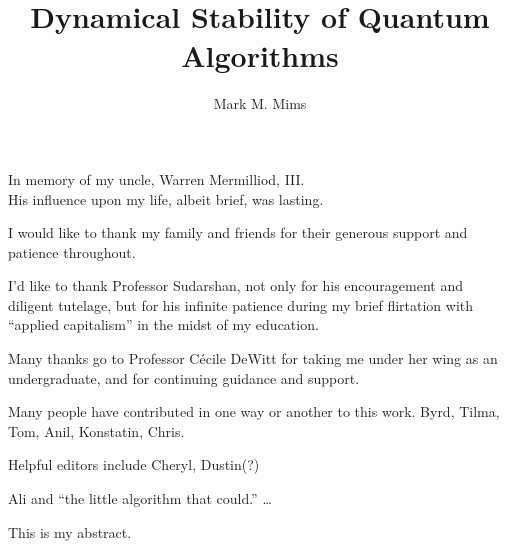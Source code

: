 \documentclass[12pt]{report} %
\author{Mark M. Mims}  %
\title{Dynamical Stability of Quantum Algorithms}
\theoremstyle{definition}
\theoremstyle{remark}
\begin{document}
\copyrightpage                  %

\titlepage                      %

\signaturepage                  %


\begin{dedication}              %
%
In memory of my uncle, Warren Mermilliod, III.  \\
His influence upon my life, albeit brief, was lasting.
\end{dedication}


\begin{acknowledgments}
%
I would like to thank my family and friends for
their generous support and patience throughout.

I'd like to thank Professor Sudarshan, not only 
for his encouragement and diligent tutelage, but for his 
infinite patience during my brief flirtation with 
``applied capitalism'' in the midst of my education.

Many thanks go to Professor C\'ecile DeWitt for taking
me under her wing as an undergraduate, and for 
continuing guidance and support.

Many people have contributed in one way or another
to this work.  
Byrd,
Tilma,
Tom,
Anil,
Konstatin,
Chris.

Helpful editors include
Cheryl,
Dustin(?)

Ali and ``the little algorithm that could.''
\dots
\end{acknowledgments}

\utabstract       %

This is my abstract.


\tableofcontents        %

\listoftables           %

\listoffigures          %




\end{document}
